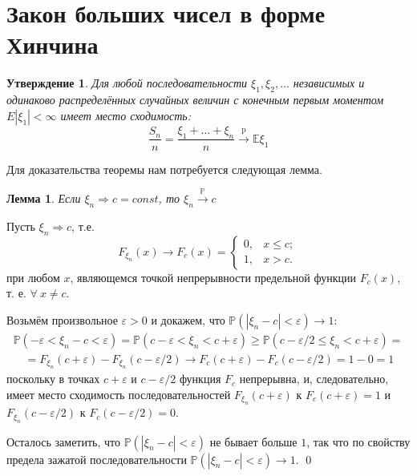 \documentclass[oneside,final,14pt]{extreport}
\renewenvironment{proof}{{\bfseries Доказательство.}}{\qed}
\theoremstyle{plain}
\newtheorem*{thm*}{Утверждение}
\newtheorem*{lem}{Лемма}
\theoremstyle{definition}
\theoremstyle{named}
\begin{document}
\section{Закон больших чисел в форме Хинчина}
\begin{thm*}
    Для любой последовательности $\xi_{1}, \xi_{2}, \ldots$ независимых и одинаково распределённых случайных величин с конечным первым моментом $E\left|\xi_{1}\right|<\infty$ имеет место сходимость:
    \begin{equation*}
        \frac{S_{n}}{n} = \frac{\xi_{1}+\ldots+\xi_{n}}{n} \xrightarrow[]{\text{p}} \mathbb{E} \xi_{1}
    \end{equation*}
\end{thm*}
Для доказательства теоремы нам потребуется следующая лемма.
\begin{lem}
    Если $\xi_{n} \Rightarrow c=const$, то $\xi_{n} \stackrel{\mathbb{P}}{\longrightarrow} c$
\end{lem}
\begin{proof}
    Пусть $\xi_{n} \Rightarrow c$, т.е.
    \begin{equation*}
        F_{\xi_{n}}(x) \rightarrow F_{c}(x) =
        \begin{cases}
            0, & x \leqslant c; \\
            1, & x > c.
        \end{cases}
    \end{equation*}
    при любом $x$, являющемся точкой непрерывности предельной функции $F_{c}(x)$, т. е. $\forall~ x \neq c$.
    
    Возьмём произвольное $\varepsilon>0$ и докажем, что $\mathbb{P}\left(\left|\xi_{n}-c\right|<\varepsilon\right) \rightarrow 1$:
    \begin{multline*}
        \mathbb{P}\left(-\varepsilon<\xi_{n}-c<\varepsilon\right)=\mathbb{P}\left(c-\varepsilon<\xi_{n}<c+\varepsilon\right) \geqslant \mathbb{P}\left(c-\varepsilon / 2 \leqslant \xi_{n}<c+\varepsilon\right)= \\
        \quad=F_{\xi_{n}}(c+\varepsilon)-F_{\xi_{n}}(c-\varepsilon / 2) \rightarrow F_{c}(c+\varepsilon)-F_{c}(c-\varepsilon / 2)=1-0=1
    \end{multline*}
    поскольку в точках $c+\varepsilon$ и $c-\varepsilon / 2$ функция $F_{c}$ непрерывна, и, следовательно, имеет место сходимость последовательностей $F_{\xi_{n}}(c+\varepsilon)$ к $F_{c}(c+\varepsilon)=1$ и $F_{\xi_{n}}(c-\varepsilon / 2)$ к $F_{c}(c-\varepsilon / 2)=0$.
    
    Осталось заметить, что $\mathbb{P}\left(\left|\xi_{n}-c\right|<\varepsilon\right)$ не бывает больше $1$, так что по свойству предела зажатой последовательности $\mathbb{P}\left(\left|\xi_{n}-c\right|<\varepsilon\right) \rightarrow 1$.
\end{proof}
\end{document}

